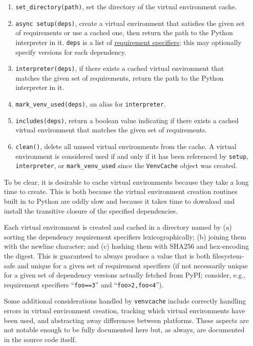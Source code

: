 \documentclass[12pt]{article}
\begin{document}
\begin{enumerate}
  \item \texttt{set\_directory(path)}, set the directory of the virtual environment cache.
  \item \texttt{async setup(deps)}, create a virtual environment that satisfies the given set of requirements or use a cached one, then return the path to the Python interpreter in it. \texttt{deps} is a list of \href{https://pip.pypa.io/en/stable/reference/requirement-specifiers/}{requirement specifiers}; this may optionally specify versions for each dependency.
  \item \texttt{interpreter(deps)}, if there exists a cached virtual environment that matches the given set of requirements, return the path to the Python interpreter in it.
  \item \texttt{mark\_venv\_used(deps)}, an alias for \texttt{interpreter}.
  \item \texttt{includes(deps)}, return a boolean value indicating if there exists a cached virtual environment that matches the given set of requirements.
  \item \texttt{clean()}, delete all unused virtual environments from the cache. A virtual environment is considered used if and only if it has been referenced by \texttt{setup}, \texttt{interpreter}, or \texttt{mark\_venv\_used} since the \texttt{VenvCache} object was created.
\end{enumerate}

To be clear, it is desirable to cache virtual environments because they take a long time to create. This is both because the virtual environment creation routines built in to Python are oddly slow and because it takes time to download and install the transitive closure of the specified dependencies.

Each virtual environment is created and cached in a directory named by (a) sorting the dependency requirement specifiers lexicographically; (b) joining them with the newline character; and (c) hashing them with SHA256 and hex-encoding the digest. This is guaranteed to always produce a value that is both filesystem-safe and unique for a given set of requirement specifiers (if not necessarily unique for a given set of dependency versions actually fetched from PyPI; consider, e.g., requirement specifiers ``\texttt{foo==3}'' and ``\texttt{foo>2,foo<4}'').

Some additional considerations handled by \texttt{venvcache} include correctly handling errors in virtual environment creation, tracking which virtual environments have been used, and abstracting away differences between platforms. These aspects are not notable enough to be fully documented here but, as always, are documented in the source code itself.
\end{document}
